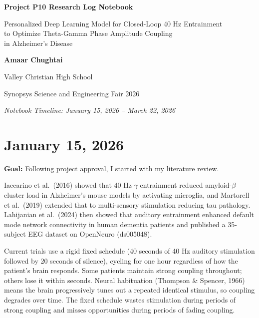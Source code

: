 \documentclass[11pt,letterpaper]{article}
\begin{document}
\begin{titlepage}
  \centering
  \vspace*{2cm}
  {\LARGE\bfseries Project P10 Research Log Notebook\par}
  \vspace{1.5em}
  {\large Personalized Deep Learning Model for Closed-Loop 40 Hz Entrainment\\[0.4em]
   to Optimize Theta-Gamma Phase Amplitude Coupling\\[0.4em]
   in Alzheimer's Disease\par}
  \vspace{2em}
  {\large\bfseries Amaar Chughtai\par}
  \vspace{0.8em}
  {\large Valley Christian High School\par}
  \vspace{0.8em}
  {\large Synopsys Science and Engineering Fair 2026\par}
  \vspace{2em}
  {\normalsize\textit{Notebook Timeline: January 15, 2026 -- March 22, 2026}\par}
  \vfill
\end{titlepage}

\tableofcontents
\newpage

\section*{January 15, 2026}

\textbf{Goal:} Following project approval, I started with my literature review.

Iaccarino et al.\ (2016) showed that 40 Hz $\gamma$ entrainment reduced amyloid-$\beta$ cluster
load in Alzheimer's mouse models by activating microglia, and Martorell et al.\ (2019) extended
that to multi-sensory stimulation reducing tau pathology. Lahijanian et al.\ (2024) then showed
that auditory entrainment enhanced default mode network connectivity in human dementia patients
and published a 35-subject EEG dataset on OpenNeuro (ds005048).

Current trials use a rigid fixed schedule (40 seconds of 40 Hz auditory stimulation followed by
20 seconds of silence), cycling for one hour regardless of how the patient's brain responds.
Some patients maintain strong coupling throughout; others lose it within seconds. Neural
habituation (Thompson \& Spencer, 1966) means the brain progressively tunes out a repeated
identical stimulus, so coupling degrades over time. The fixed schedule wastes stimulation during
periods of strong coupling and misses opportunities during periods of fading coupling.
\end{document}
